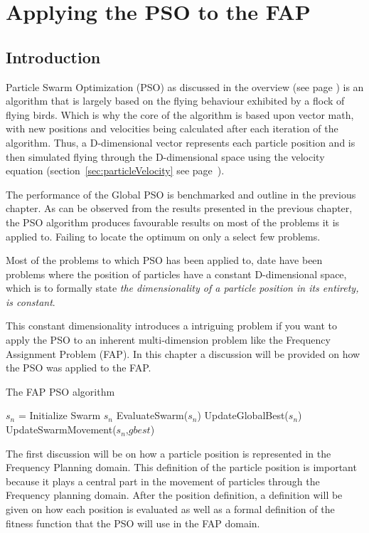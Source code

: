 \chapter{Applying the PSO to the FAP}
\label{chpt:psoapplicationFAP}
\section{Introduction}
Particle Swarm Optimization (PSO) as discussed in the overview (see page \pageref{sec:PSO}) is an algorithm that is largely based on the flying behaviour exhibited by a flock of flying birds. Which is why the core of the algorithm is based upon vector math, with new positions and velocities being calculated after each iteration of the algorithm. Thus, a D-dimensional vector represents each particle position and is then simulated flying through the D-dimensional space using the velocity equation (section~\ref{sec:particleVelocity} see page~\pageref{eq:velocityupdate}).

The performance of the Global PSO is benchmarked and outline in the previous chapter. As can be observed from the results presented in the previous chapter, the PSO algorithm produces favourable results on most of the problems it is applied to. Failing to locate the optimum on only a select few problems. 

Most of the problems to which PSO has been applied to, date have been problems where the position of particles have a constant D-dimensional space, which is to formally state \emph{the dimensionality of a particle position in its entirety, is constant}.

This constant dimensionality introduces a intriguing problem if you want to apply the PSO to an inherent multi-dimension problem like the Frequency Assignment Problem (FAP). In this chapter a discussion will be provided on how the PSO was applied to the FAP.

\begin{algorithm}
\label{alg:FAPPSO}
\caption{The FAP PSO algorithm}
\begin{algorithmic}
\STATE $s_n$ = Initialize Swarm $s_n$
	\STATE EvaluateSwarm($s_n$)
	\STATE UpdateGlobalBest($s_n$)
	\STATE UpdateSwarmMovement($s_n$,$gbest$)
\ENDWHILE
\end{algorithmic}
\end{algorithm}

The first discussion will be on how a particle position is represented in the Frequency Planning domain. This definition of the particle position is important because it plays a central part in
the movement of particles through the Frequency planning domain. After the position definition, a definition will be given on how each position is evaluated as well as a formal definition of the fitness function that the PSO will use in the FAP domain.

